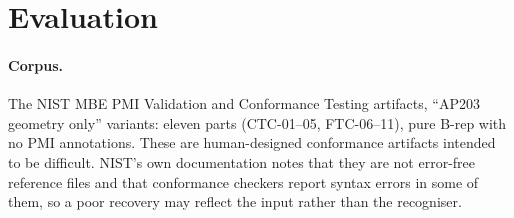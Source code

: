 \documentclass[11pt]{article}
\begin{document}
\section{Evaluation}
\label{sec:results}

\paragraph{Corpus.} The NIST MBE PMI Validation and Conformance Testing
artifacts, ``AP203 geometry only'' variants: eleven parts (CTC-01--05,
FTC-06--11), pure B-rep with no PMI annotations. These are human-designed
conformance artifacts intended to be difficult. NIST's own documentation notes
that they are not error-free reference files and that conformance checkers
report syntax errors in some of them, so a poor recovery may reflect the input
rather than the recogniser.
\end{document}
